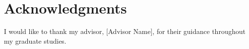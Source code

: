 \chapter*{Acknowledgments}


I would like to thank my advisor, [Advisor Name], for their guidance throughout my graduate studies.

